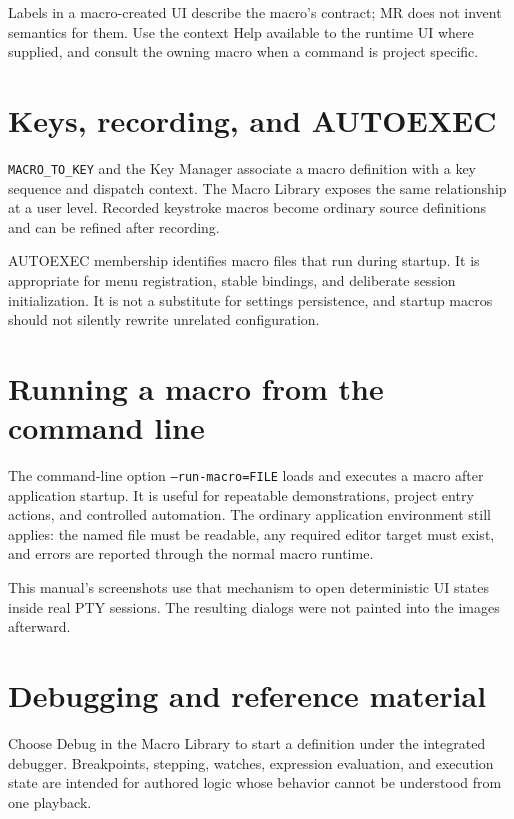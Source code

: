\documentclass[a4paper,10pt,twoside,openany]{book}
\newcommand{\mr}{\textsc{MR}}
\begin{document}
Labels in a macro-created UI describe the macro's contract; \mr{} does not
invent semantics for them. Use the context Help available to the runtime UI
where supplied, and consult the owning macro when a command is project
specific.

\section{Keys, recording, and AUTOEXEC}

\texttt{MACRO\_TO\_KEY} and the Key Manager associate a macro definition with
a key sequence and dispatch context. The Macro Library exposes the same
relationship at a user level. Recorded keystroke macros become ordinary
source definitions and can be refined after recording.

AUTOEXEC membership identifies macro files that run during startup. It is
appropriate for menu registration, stable bindings, and deliberate session
initialization. It is not a substitute for settings persistence, and startup
macros should not silently rewrite unrelated configuration.

\section{Running a macro from the command line}

The command-line option \texttt{--run-macro=FILE} loads and executes a macro
after application startup. It is useful for repeatable demonstrations,
project entry actions, and controlled automation. The ordinary application
environment still applies: the named file must be readable, any required
editor target must exist, and errors are reported through the normal macro
runtime.

This manual's screenshots use that mechanism to open deterministic UI states
inside real PTY sessions. The resulting dialogs were not painted into the
images afterward.

\section{Debugging and reference material}

Choose Debug in the Macro Library to start a definition under the integrated
debugger. Breakpoints, stepping, watches, expression evaluation, and execution
state are intended for authored logic whose behavior cannot be understood
from one playback.
\end{document}
